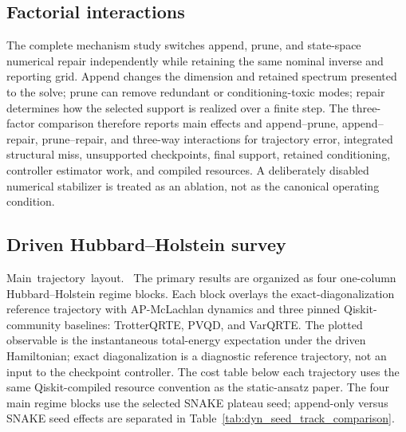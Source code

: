 \documentclass[
  reprint,
  amsmath,
  amssymb,
  aps,
  pra,
  nofootinbib,
  superscriptaddress,
  floatfix
]{revtex4-2}
\newcommand{\tentative}[1]{\textcolor{red!70!black}{#1}}
\newcommand{\structlabel}[1]{\noindent\mbox{\tentative{#1.}}~}
\begin{document}
\subsection{Factorial interactions}

The complete mechanism study switches append, prune, and state-space numerical repair independently while retaining the same nominal inverse and reporting grid.  Append changes the dimension and retained spectrum presented to the solve; prune can remove redundant or conditioning-toxic modes; repair determines how the selected support is realized over a finite step.  The three-factor comparison therefore reports main effects and append--prune, append--repair, prune--repair, and three-way interactions for trajectory error, integrated structural miss, unsupported checkpoints, final support, retained conditioning, controller estimator work, and compiled resources.  A deliberately disabled numerical stabilizer is treated as an ablation, not as the canonical operating condition.

\subsection{Driven Hubbard--Holstein survey}

\structlabel{Main trajectory layout}
The primary results are organized as four one-column Hubbard--Holstein regime blocks.  Each block overlays the exact-diagonalization reference trajectory with AP-McLachlan dynamics and three pinned Qiskit-community baselines: TrotterQRTE, PVQD, and VarQRTE.  The plotted observable is the instantaneous total-energy expectation under the driven Hamiltonian; exact diagonalization is a diagnostic reference trajectory, not an input to the checkpoint controller.  The cost table below each trajectory uses the same Qiskit-compiled resource convention as the static-ansatz paper.  The four main regime blocks use the selected SNAKE plateau seed; append-only versus SNAKE seed effects are separated in Table~\ref{tab:dyn_seed_track_comparison}.
\end{document}
